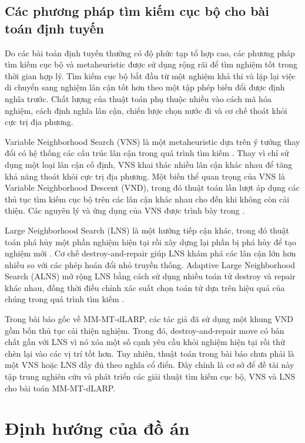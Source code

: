 \subsection{Các phương pháp tìm kiếm cục bộ cho bài toán định tuyến}

Do các bài toán định tuyến thường có độ phức tạp tổ hợp cao, các phương pháp tìm kiếm cục bộ và metaheuristic được sử dụng rộng rãi để tìm nghiệm tốt trong thời gian hợp lý. Tìm kiếm cục bộ bắt đầu từ một nghiệm khả thi và lặp lại việc di chuyển sang nghiệm lân cận tốt hơn theo một tập phép biến đổi được định nghĩa trước. Chất lượng của thuật toán phụ thuộc nhiều vào cách mã hóa nghiệm, cách định nghĩa lân cận, chiến lược chọn nước đi và cơ chế thoát khỏi cực trị địa phương.

Variable Neighborhood Search (VNS) là một metaheuristic dựa trên ý tưởng thay đổi có hệ thống các cấu trúc lân cận trong quá trình tìm kiếm \cite{mladenovic1997vns}. Thay vì chỉ sử dụng một loại lân cận cố định, VNS khai thác nhiều lân cận khác nhau để tăng khả năng thoát khỏi cực trị địa phương. Một biến thể quan trọng của VNS là Variable Neighborhood Descent (VND), trong đó thuật toán lần lượt áp dụng các thủ tục tìm kiếm cục bộ trên các lân cận khác nhau cho đến khi không còn cải thiện. Các nguyên lý và ứng dụng của VNS được trình bày trong \cite{hansen2001vns,hansen2010vns}.

Large Neighborhood Search (LNS) là một hướng tiếp cận khác, trong đó thuật toán phá hủy một phần nghiệm hiện tại rồi xây dựng lại phần bị phá hủy để tạo nghiệm mới \cite{shaw1998lns}. Cơ chế destroy-and-repair giúp LNS khám phá các lân cận lớn hơn nhiều so với các phép hoán đổi nhỏ truyền thống. Adaptive Large Neighborhood Search (ALNS) mở rộng LNS bằng cách sử dụng nhiều toán tử destroy và repair khác nhau, đồng thời điều chỉnh xác suất chọn toán tử dựa trên hiệu quả của chúng trong quá trình tìm kiếm \cite{ropke2006alns,pisinger2007vrp}.

Trong bài báo gốc về MM-MT-dLARP, các tác giả đã sử dụng một khung VND gồm bốn thủ tục cải thiện nghiệm. Trong đó, destroy-and-repair move có bản chất gần với LNS vì nó xóa một số cạnh yêu cầu khỏi nghiệm hiện tại rồi thử chèn lại vào các vị trí tốt hơn. Tuy nhiên, thuật toán trong bài báo chưa phải là một VNS hoặc LNS đầy đủ theo nghĩa cổ điển. Đây chính là cơ sở để đề tài này tập trung nghiên cứu và phát triển các giải thuật tìm kiếm cục bộ, VNS và LNS cho bài toán MM-MT-dLARP.

\section{Định hướng của đồ án}

